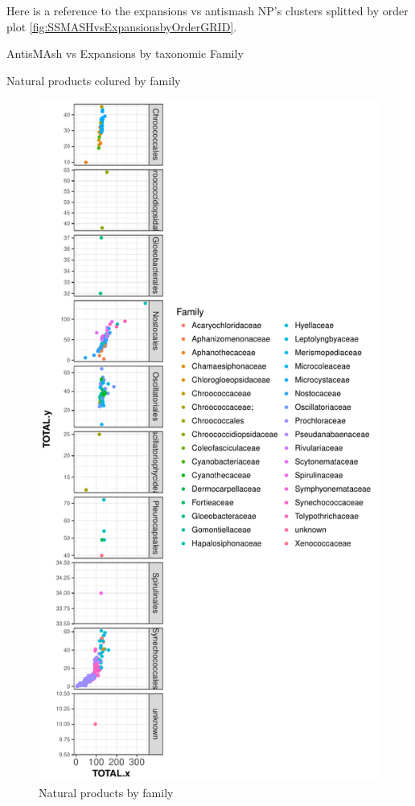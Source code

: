 \documentclass[12pt,twoside]{reedthesis}
\begin{document}
  Here is a reference to the expansions vs antismash NP's clusters
  splitted by order plot \autoref{fig:SSMASHvsExpansionsbyOrderGRID}.
  \clearpage 
  
  AntisMAsh vs Expansions by taxonomic Family
  
  Natural products colured by family
  
  \begin{figure}[h!tbp]
  \centering
  \includegraphics[angle = 0,scale = 0.6]{chapter2/Cyanobacteria/npf.pdf}
  \caption[Natural products by family]{\normalsize{Natural products by family}}
  \label{fig:npf}
  \end{figure}
  
\end{document}
